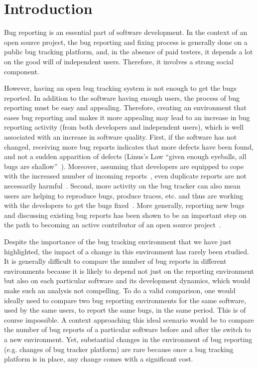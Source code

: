 \documentclass[conference]{IEEEtran}
\begin{document}
\section{Introduction}

Bug reporting is an essential part of software development.
In the context of an open source project, the bug reporting and fixing process is generally done on a public bug tracking platform, and, in the absence of paid testers, it depends a lot on the good will of independent users. Therefore, it involves a strong social component.

However, having an open bug tracking system is not enough to get the bugs reported. In addition to the software having enough users, the process of bug reporting must be easy and appealing. Therefore, creating an environment that eases bug reporting and makes it more appealing may lead to an increase in bug reporting activity (from both developers and independent users), which is well associated with an increase in software quality. First, if the software has not changed, receiving more bug reports indicates that more defects have been found, and not a sudden apparition of defects (Linus's Law ``given enough eyeballs, all bugs are shallow''~\cite{raymond1999cathedral,van2009shallow}). Moreover, assuming that developers are equipped to cope with the increased number of incoming reports~\cite{anvik2005coping, davidson2011coping}, even duplicate reports are not necessarily harmful~\cite{Bettenburg2008}. Second, more activity on the bug tracker can also mean users are helping to reproduce bugs, produce traces, etc. and thus are working with the developers to get the bugs fixed~\cite{breu2010information}. More generally, reporting new bugs and discussing existing bug reports has been shown to be an important step on the path to becoming an active contributor of an open source project~\cite{jensen2007role, nakakoji2002evolution, ye2003toward}.

Despite the importance of the bug tracking environment that we have just highlighted, the impact of a change in this environment has rarely been studied. It is generally difficult to compare the number of bug reports in different environments because it is likely to depend  not just on the reporting environment but also on each particular software and its development dynamics, which would make such an analysis not compelling. To do a valid comparison, one would ideally need to compare two bug reporting environments for the same software, used by the same users, to report the same bugs, in the same period. This is of course impossible. A context approaching this ideal scenario would be to compare the number of bug reports of a particular software before and after the switch to a new environment. Yet, substantial changes in the environment of bug reporting (e.g. changes of bug tracker platform) are rare because once a bug tracking platform is in place, any change comes with a significant cost. 
\end{document}
